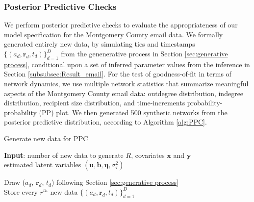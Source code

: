 \documentclass[12pt]{article}
\begin{document}
	\subsubsection{Posterior Predictive Checks}\label{subsubsec:PPC_email} 	   
	We perform posterior predictive checks \cite{rubin1984bayesianly} to evaluate the appropriateness of our model specification for the Montgomery County email data. We formally generated entirely new data, by simulating ties and timestamps $\{(a_{d}, \boldsymbol{r}_{d}, t_{d})\}_{d=1}^D$ from the genenerative process in Section \ref{sec:generative process}, conditional upon a set of inferred parameter values from the inference in Section \ref{subsubsec:Result_email}. For the test of goodness-of-fit in terms of network dynamics, we use multiple network statistics that summarize meaningful aspects of the Montgomery County email data: outdegree distribution, indegree distribution, recipient size distribution, and time-increments probability-probability (PP) plot. We then generated 500 synthetic networks from the posterior predictive distribution, according to Algorithm \ref{alg:PPC}.
	\begin{algorithm}[!t]
		\caption{Generate new data for PPC}
		\begin{algorithmic}
			\STATE \textbf{Input}: number of new data to generate $R$, covariates $\boldsymbol{x}$ and $\boldsymbol{y}$\\
			estimated latent variables $(\boldsymbol{u}, \boldsymbol{b}, \boldsymbol{\eta},  \sigma_\tau^2)$\\
			\vskip 0.1in
			
			\STATE	Draw ($a_{d}$, $\boldsymbol{r}_{d}$, $t_{d}$) following Section \ref{sec:generative process}\\
			\ENDFOR
			\STATE Store every $r^{th}$ new data $\{(a_{d}, \boldsymbol{r}_{d}, t_{d})\}_{d=1}^D$ 
			\ENDFOR
		\end{algorithmic}
		 				\label{alg:PPC}
	\end{algorithm}       
\end{document}
